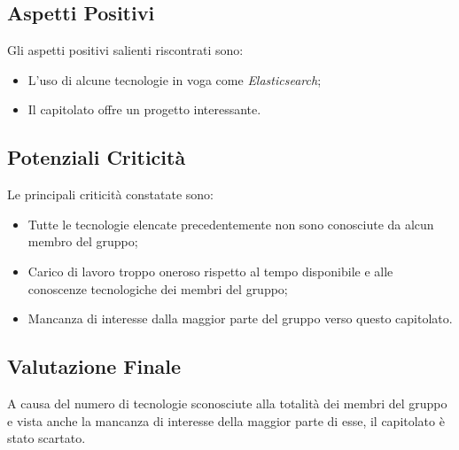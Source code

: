 \subsection{Aspetti Positivi}
Gli aspetti positivi salienti riscontrati sono:
\begin{itemize}
	\item L'uso di alcune tecnologie in voga come \textit{Elasticsearch};
	\item Il capitolato offre un progetto interessante.
\end{itemize}

\subsection{Potenziali Criticità}
Le principali criticità constatate sono:
\begin{itemize}
	\item Tutte le tecnologie elencate precedentemente non sono conosciute da alcun membro del gruppo;
	\item Carico di lavoro troppo oneroso rispetto al tempo disponibile e alle conoscenze tecnologiche dei membri del gruppo;
	\item Mancanza di interesse dalla maggior parte del gruppo verso questo capitolato.
\end{itemize}

\subsection{Valutazione Finale}
A causa del numero di tecnologie sconosciute alla totalità dei membri del gruppo e vista anche la mancanza di interesse della maggior parte di esse, il capitolato è stato scartato.
	